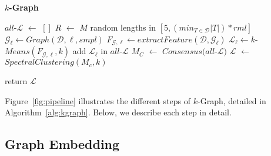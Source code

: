 \IncMargin{0.5em}
\begin{algorithm}[tb]
{\small
    \caption{\textbf{$k$-Graph}}\label{alg:kgraph}
    \BlankLine
    $all$-$\mathcal{L}$ $\leftarrow$ $[]$ \;
    $R$ $\leftarrow$ $M$ random lengths in $[5,(min_{T \in \mathcal{D}} |T|)*rml]$ \;
    {
        $\mathcal{G}_\ell \leftarrow Graph(\mathcal{D},\ell,smpl)$ 
        $F_{\mathcal{G},\ell} \leftarrow extractFeature(\mathcal{D},\mathcal{G}_\ell)$ 
        $\mathcal{L}_{\ell} \leftarrow k$-$Means(F_{\mathcal{G},\ell},k)$ 
        add $\mathcal{L}_{\ell}$ in $all$-$\mathcal{L}$\;
    }
    $M_C$ $\leftarrow$ $Consensus(all$-$\mathcal{L})$ 
    $\mathcal{L}$ $\leftarrow$ $SpectralClustering(M_c,k)$ 

    return $\mathcal{L}$

    
}
\end{algorithm}
\DecMargin{0.5em}

Figure~\ref{fig:pipeline} illustrates the different steps of $k$-Graph, detailed in Algorithm~\ref{alg:kgraph}.
Below, we describe each step in detail.

\subsection{Graph Embedding}
\label{sol:graphembedding}

